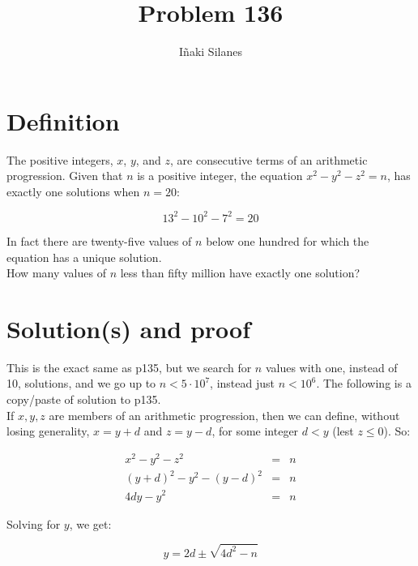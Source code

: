 \documentclass[english]{article}
\begin{document}
\newcommand{\mc}{\multicolumn}
\newcommand{\mr}{\multirow}
\newcommand{\cw}{\columnwidth}
\newcommand{\ig}[2]{\texttt{[image: \#2]}}

\title{Problem 136}
\author{I\~naki Silanes}
\maketitle

\section{Definition}

The positive integers, $x$, $y$, and $z$, are consecutive terms of an arithmetic progression. Given that $n$ is a positive integer, the equation $x^2 - y^2 - z^2 = n$, has exactly one solutions when $n = 20$:

\begin{equation}
13^2 - 10^2 - 7^2 = 20
\end{equation}

In fact there are twenty-five values of $n$ below one hundred for which the equation has a unique solution.\\

How many values of $n$ less than fifty million have exactly one solution?

\section{Solution(s) and proof}

This is the exact same as p135, but we search for $n$ values with one, instead of 10, solutions, and we go up to $n < 5\cdot 10^7$, instead just $n < 10^6$. The following is a copy/paste of solution to p135.\\

If ${x,y,z}$ are members of an arithmetic progression, then we can define, without losing generality, $x = y + d$ and $z = y - d$, for some integer $d < y$ (lest $z \leq 0$). So:

\begin{eqnarray}
x^2 - y^2 - z^2 & = & n \\
(y+d)^2 - y^2 - (y-d)^2 & = & n \\
4 d y - y^2 & = & n \label{eq:n}
\end{eqnarray}

Solving for $y$, we get:

\begin{equation}
y = 2d \pm \sqrt{4d^2-n} \label{eq:y}
\end{equation}
\end{document}
